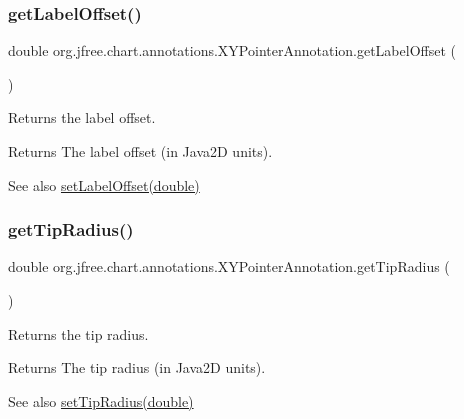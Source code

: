 \subsubsection{\texorpdfstring{get\+Label\+Offset()}{getLabelOffset()}}
{\footnotesize\ttfamily double org.\+jfree.\+chart.\+annotations.\+X\+Y\+Pointer\+Annotation.\+get\+Label\+Offset (\begin{DoxyParamCaption}{ }\end{DoxyParamCaption})}

Returns the label offset.

\begin{DoxyReturn}{Returns}
The label offset (in Java2D units).
\end{DoxyReturn}
\begin{DoxySeeAlso}{See also}
\mbox{\hyperlink{classorg_1_1jfree_1_1chart_1_1annotations_1_1_x_y_pointer_annotation_a61ee30840b0737c260e55b00082e207c}{set\+Label\+Offset(double)}} 
\end{DoxySeeAlso}
\mbox{\label{classorg_1_1jfree_1_1chart_1_1annotations_1_1_x_y_pointer_annotation_aad79a5c813eb31e69f2f7bad643ec70a}} 
\subsubsection{\texorpdfstring{get\+Tip\+Radius()}{getTipRadius()}}
{\footnotesize\ttfamily double org.\+jfree.\+chart.\+annotations.\+X\+Y\+Pointer\+Annotation.\+get\+Tip\+Radius (\begin{DoxyParamCaption}{ }\end{DoxyParamCaption})}

Returns the tip radius.

\begin{DoxyReturn}{Returns}
The tip radius (in Java2D units).
\end{DoxyReturn}
\begin{DoxySeeAlso}{See also}
\mbox{\hyperlink{classorg_1_1jfree_1_1chart_1_1annotations_1_1_x_y_pointer_annotation_a35017408da6404615081e0bd00a75578}{set\+Tip\+Radius(double)}} 
\end{DoxySeeAlso}
\mbox{\label{classorg_1_1jfree_1_1chart_1_1annotations_1_1_x_y_pointer_annotation_a0e5736df79fef1467eac6d1dbae6095c}} 
